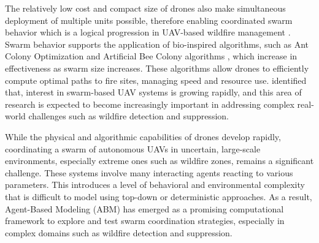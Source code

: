 \documentclass[twoside]{article}
\begin{document}
The relatively low cost and compact size of drones also make simultaneous deployment of multiple units possible, therefore enabling coordinated swarm behavior which is a logical progression in UAV-based wildfire management \citep{MetaanalysisHumansystemInterfaces}. Swarm behavior supports the application of bio-inspired algorithms, such as Ant Colony Optimization \citep{HybridAntColonyWildfire} and Artificial Bee Colony algorithms \citep{karaboga2007abc}, which increase in effectiveness as swarm size increases. These algorithms allow drones to efficiently compute optimal paths to fire sites, managing speed and resource use. \citet*{MetaanalysisHumansystemInterfaces} identified that, interest in swarm-based UAV systems is growing rapidly, and this area of research is expected to become increasingly important in addressing complex real-world challenges such as wildfire detection and suppression.

While the physical and algorithmic capabilities of drones develop rapidly, coordinating a swarm of autonomous UAVs in uncertain, large-scale environments, especially extreme ones such as wildfire zones, remains a significant challenge. These systems involve many interacting agents reacting to various parameters. This introduces a level of behavioral and environmental complexity that is difficult to model using top-down or deterministic approaches. As a result, Agent-Based Modeling (ABM) has emerged as a promising computational framework to explore and test swarm coordination strategies, especially in complex domains such as wildfire detection and suppression.
\end{document}
